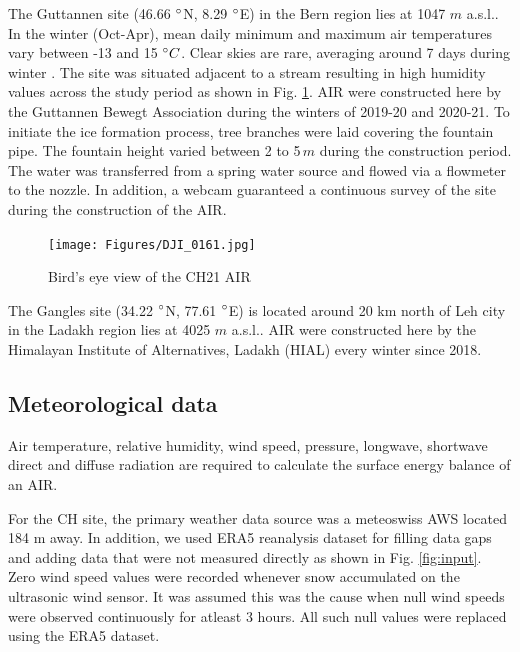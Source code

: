 \documentclass[utf8]{frontiersSCNS} %
\begin{document}
The Guttannen site (46.66 $\degree$N, 8.29 $\degree$E) in the Bern region lies at 1047 $m$ a.s.l.. In the winter (Oct-Apr), mean
daily minimum and maximum air temperatures vary between -13 and 15 $\degree C$. Clear skies are rare, averaging around 7
days during winter \citep{eispalast}. The site was situated adjacent to a stream resulting in high humidity values
across the study period as shown in Fig. \ref{fig:CHsite}. AIR were constructed here by the Guttannen Bewegt Association
during the winters of 2019-20 and 2020-21. To initiate the ice formation process, tree branches were laid covering the
fountain pipe.  The fountain height varied between 2 to 5\,$m$ during the construction period. The water was transferred
from a spring water source and flowed via a flowmeter to the nozzle. In addition, a webcam guaranteed a continuous
survey of the site during the construction of the AIR.

\begin{figure} 
    \begin{center} 
        \texttt{[image: Figures/DJI\_0161.jpg]} 
    \end{center} 
\caption{Bird's eye view of the CH21 AIR} 
\label{fig:CHsite} 
\end{figure}


The Gangles site (34.22 $\degree$N, 77.61 $\degree$E) is located around 20 km north of Leh city in the Ladakh region
lies at 4025 $m$ a.s.l.. AIR were constructed here by the Himalayan Institute of Alternatives, Ladakh (HIAL) every
winter since 2018.

\subsection{Meteorological data} 
Air temperature, relative humidity, wind speed, pressure, longwave, shortwave direct and diffuse radiation are required
to calculate the surface energy balance of an AIR. 

For the CH site, the primary weather data source was a meteoswiss AWS located 184 m away. In addition, we used ERA5
reanalysis dataset \citep{era5} for filling data gaps and adding data that were not measured directly as shown in Fig.
\ref{fig:input}. Zero wind speed values were recorded whenever snow accumulated on the ultrasonic wind sensor. It was
assumed this was the cause when null wind speeds were observed continuously for atleast 3 hours. All such null values
were replaced using the ERA5 dataset. 
\end{document}
